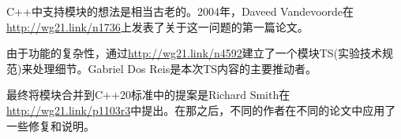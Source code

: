 C++中支持模块的想法是相当古老的。2004年，Daveed Vandevoorde在\url{http://wg21.link/n1736}上发表了关于这一问题的第一篇论文。

由于功能的复杂性，通过\url{http://wg21.link/n4592}建立了一个模块TS(实验技术规范)来处理细节。Gabriel Dos Reis是本次TS内容的主要推动者。

最终将模块合并到C++20标准中的提案是Richard Smith在\url{http://wg21.link/p1103r3}中提出。在那之后，不同的作者在不同的论文中应用了一些修复和说明。